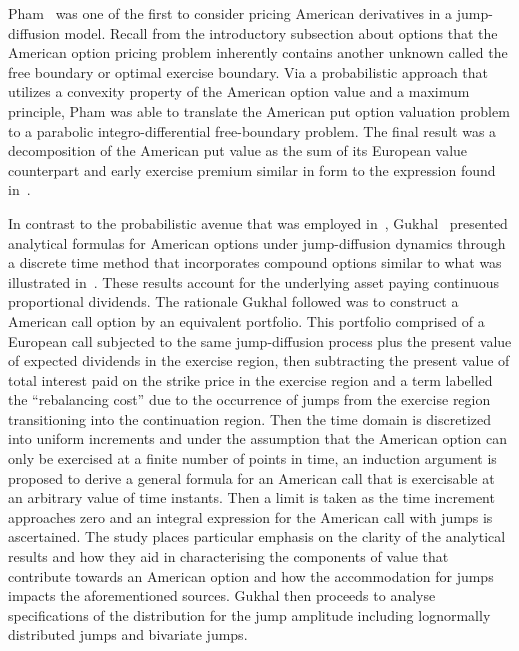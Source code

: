 Pham~\cite{Pham1997} was one of the first to consider pricing American derivatives in a jump-diffusion model. Recall from the introductory subsection about options that the American option pricing problem inherently contains another unknown called the free boundary or optimal exercise boundary. Via a probabilistic approach that utilizes a convexity property of the American option value and a maximum principle, Pham was able to translate the American put option valuation problem to a parabolic integro-differential free-boundary problem. The final result was a decomposition of the American put value as the sum of its European value counterpart and early exercise premium similar in form to the expression found in~\cite{Kim1990}.

In contrast to the probabilistic avenue that was employed in~\cite{Pham1997}, Gukhal~\cite{Gukhal2001} presented analytical formulas for American options under jump-diffusion dynamics through a discrete time method that incorporates compound options similar to what was illustrated in~\cite{Geske1979}. These results account for the underlying asset paying continuous proportional dividends. The rationale Gukhal followed was to construct a American call option by an equivalent portfolio. This portfolio comprised of a European call subjected to the same jump-diffusion process plus the present value of expected dividends in the exercise region, then subtracting the present value of total interest paid on the strike price in the exercise region and a term labelled the ``rebalancing cost'' due to the occurrence of jumps from the exercise region transitioning into the continuation region. Then the time domain is discretized into uniform increments and under the assumption that the American option can only be exercised at a finite number of points in time, an induction argument is proposed to derive a general formula for an American call that is exercisable at an arbitrary value of time instants. Then a limit is taken as the time increment approaches zero and an integral expression for the American call with jumps is ascertained. The study places particular emphasis on the clarity of the analytical results and how they aid in characterising the components of value that contribute towards an American option and how the accommodation for jumps impacts the aforementioned sources. Gukhal then proceeds to analyse specifications of the distribution for the jump amplitude including lognormally distributed jumps and bivariate jumps. 

